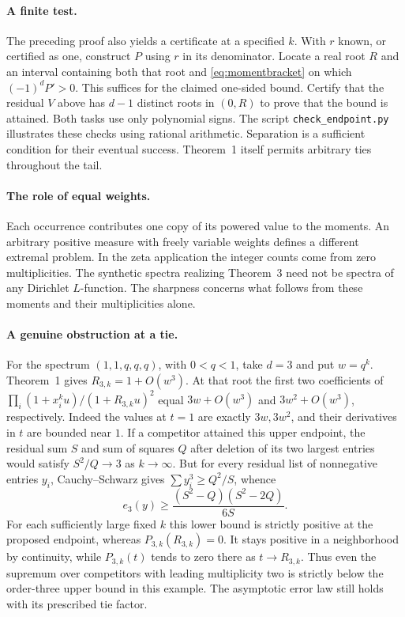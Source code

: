 \documentclass[11pt]{article}
\begin{document}
\paragraph{A finite test.}
The preceding proof also yields a certificate at a specified $k$. With $r$
known, or certified as one, construct $P$ using $r$ in its denominator.
Locate a real root $R$ and an interval containing both that root and
\eqref{eq:momentbracket} on which $(-1)^dP'>0$. This suffices for the claimed
one-sided bound. Certify that the residual $V$ above has $d-1$ distinct roots
in $(0,R)$ to prove that the bound is attained. Both tasks use only polynomial
signs. The script \texttt{check\_endpoint.py} illustrates these checks using
rational arithmetic. Separation is a sufficient condition for their eventual
success. Theorem~1 itself permits arbitrary ties throughout the tail.

\paragraph{The role of equal weights.}
Each occurrence contributes one copy of its powered value to the moments.
An arbitrary positive measure with freely variable weights defines a different
extremal problem. In the zeta application the integer counts come from zero
multiplicities. The synthetic spectra realizing Theorem~3 need not be spectra
of any Dirichlet $L$-function. The sharpness concerns what follows from these
moments and their multiplicities alone.

\paragraph{A genuine obstruction at a tie.}
For the spectrum $(1,1,q,q,q)$, with $0<q<1$, take $d=3$ and put $w=q^k$.
Theorem~1 gives $R_{3,k}=1+O(w^3)$. At that root the first two coefficients
of $\prod_i(1+x_i^ku)/(1+R_{3,k}u)^2$ equal $3w+O(w^3)$ and
$3w^2+O(w^3)$, respectively. Indeed the values at $t=1$ are exactly
$3w,3w^2$, and their derivatives in $t$ are bounded near $1$. If a
competitor attained this upper endpoint, the residual sum $S$ and sum of
squares $Q$ after deletion of its two largest entries would satisfy
$S^2/Q\to3$ as $k\to\infty$. But for every residual list of nonnegative
entries $y_i$, Cauchy--Schwarz gives
$\sum y_i^3\ge Q^2/S$, whence
\[
  e_3(y)\ge \frac{(S^2-Q)(S^2-2Q)}{6S}.
\]
For each sufficiently large fixed $k$ this lower bound is strictly positive
at the proposed endpoint, whereas $P_{3,k}(R_{3,k})=0$. It stays positive in
a neighborhood by continuity, while $P_{3,k}(t)$ tends to zero there as
$t\to R_{3,k}$. Thus even the supremum over competitors with leading
multiplicity two is strictly below the order-three upper bound in this
example. The asymptotic error law still holds with its prescribed tie factor.
\end{document}
